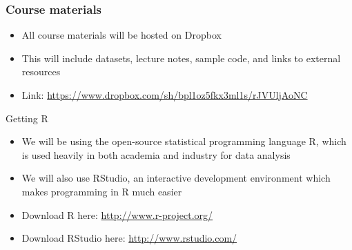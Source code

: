 \documentclass{beamer}
\begin{document}
\begin{frame}
\frametitle{Course materials}
\begin{itemize}
	\item All course materials will be hosted on Dropbox
	\item This will include datasets, lecture notes, sample code, and links to external resources
	\item Link: \url{https://www.dropbox.com/sh/bpl1oz5fkx3ml1s/rJVUljAoNC}
\end{itemize}
\end{frame}

\begin{frame}{Getting R}
\begin{itemize}
	\item We will be using the open-source statistical programming language R, which is used heavily in both academia and industry for data analysis
	\item We will also use RStudio, an interactive development environment which makes programming in R much easier
	\item Download R here: \url{http://www.r-project.org/}
	\item Download RStudio here: \url{http://www.rstudio.com/}
\end{itemize}
\end{frame}
\end{document}
